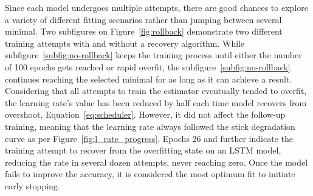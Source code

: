 Since each model undergoes multiple attempts, there are good chances to explore a variety of different fitting scenarios rather than jumping between several minimal.
Two subfigures on \mbox{Figure~\ref{fig:rollback}} demonstrate two different training attempts with and without a recovery algorithm.
While subfigure~\ref{subfig:no-rollback} keeps the training process until either the number of 100 epochs gets reached or rapid overfit, the subfigure~\ref{subfig:no-rollback} continues reaching the selected minimal for as long as it can achieve a result.
Considering that all attempts to train the estimator eventually tended to overfit, the learning rate's value has been reduced by half each time model recovers from overshoot, Equation~\ref{eq:scheduler}.
However, it did not affect the follow-up training, meaning that the learning rate always followed the stick degradation curve as per Figure~\ref{fig:l_rate_progress}.
Epochs 26 and further indicate the training attempt to recover from the overfitting state on an LSTM model, reducing the rate in several dozen attempts, never reaching zero.
Once the model fails to improve the accuracy, it is considered the most optimum fit to initiate early stopping.

